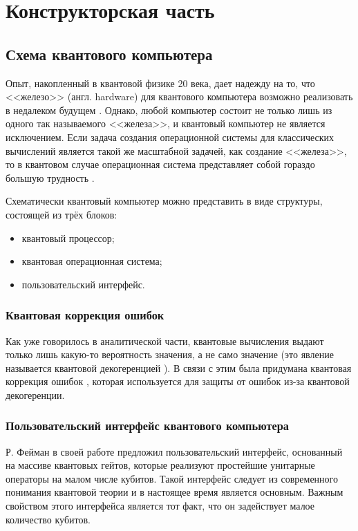 \chapter{Конструкторская часть}

\section{Схема квантового компьютера}

Опыт, накопленный в квантовой физике 20 века, дает надежду на то, что <<железо>> (англ. hardware) для квантового компьютера возможно реализовать в недалеком будущем \cite{quantum-computer}. Однако, любой компьютер состоит не только лишь из одного так называемого <<железа>>, и квантовый компьютер не является исключением. Если задача создания операционной системы для классических вычислений является такой же масштабной задачей, как создание <<железа>>, то в квантовом случае операционная система представляет собой гораздо большую трудность \cite{quantum-computer}.

Схематически квантовый компьютер можно представить в виде структуры, состоящей из трёх блоков:

\begin{itemize}
	\item квантовый процессор;
	\item квантовая операционная система;
	\item пользовательский интерфейс.
\end{itemize}

\subsection{Квантовая коррекция ошибок}
Как уже говорилось в аналитической части, квантовые вычисления выдают только лишь какую-то вероятность значения, а не само значение (это явление называется квантовой декогеренцией \cite{decog}). В связи с этим была придумана квантовая коррекция ошибок \cite{quantum-codes}, которая используется для защиты от ошибок из-за квантовой декогеренции.

\subsection{Пользовательский интерфейс квантового компьютера}\label{qgui}

Р. Фейман в своей работе \cite{feynman} предложил пользовательский интерфейс, основанный на массиве квантовых гейтов, которые реализуют простейшие унитарные операторы на малом числе кубитов. Такой интерфейс следует из современного понимания квантовой теории \cite{quantum-computer} и в настоящее время является основным. Важным свойством этого интерфейса является тот факт, что он задействует малое количество кубитов.


